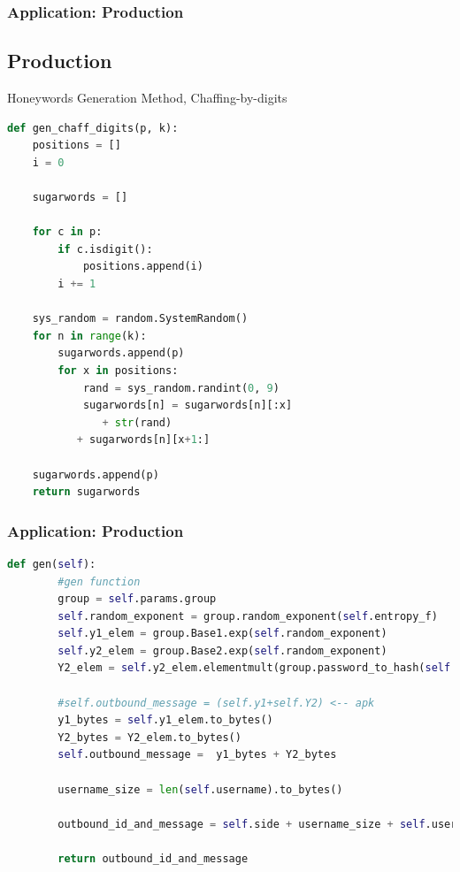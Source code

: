\documentclass[9pt]{beamer}
\begin{document}
\begin{frame}[fragile]
\frametitle{Application: Production}
\subsection{Production}
Honeywords Generation Method, Chaffing-by-digits
\begin{lstlisting}[language=Python]
def gen_chaff_digits(p, k):
    positions = []
    i = 0

    sugarwords = []

    for c in p:
        if c.isdigit():
            positions.append(i)
        i += 1

    sys_random = random.SystemRandom()
    for n in range(k):
        sugarwords.append(p)
        for x in positions:
            rand = sys_random.randint(0, 9)
            sugarwords[n] = sugarwords[n][:x] 
	    	   + str(rand) 
		   + sugarwords[n][x+1:]

    sugarwords.append(p)
    return sugarwords
\end{lstlisting}
\end{frame}

\begin{frame}[fragile]
\frametitle{Application: Production}
\begin{lstlisting}[language=Python]
    def gen(self):
        #gen function
        group = self.params.group
        self.random_exponent = group.random_exponent(self.entropy_f)
        self.y1_elem = group.Base1.exp(self.random_exponent)
        self.y2_elem = group.Base2.exp(self.random_exponent)
        Y2_elem = self.y2_elem.elementmult(group.password_to_hash(self.pw))

        #self.outbound_message = (self.y1+self.Y2) <-- apk
        y1_bytes = self.y1_elem.to_bytes()
        Y2_bytes = Y2_elem.to_bytes()
        self.outbound_message =  y1_bytes + Y2_bytes

        username_size = len(self.username).to_bytes()

        outbound_id_and_message = self.side + username_size + self.username + self.outbound_message

        return outbound_id_and_message
\end{lstlisting}
\end{frame}
\end{document}
